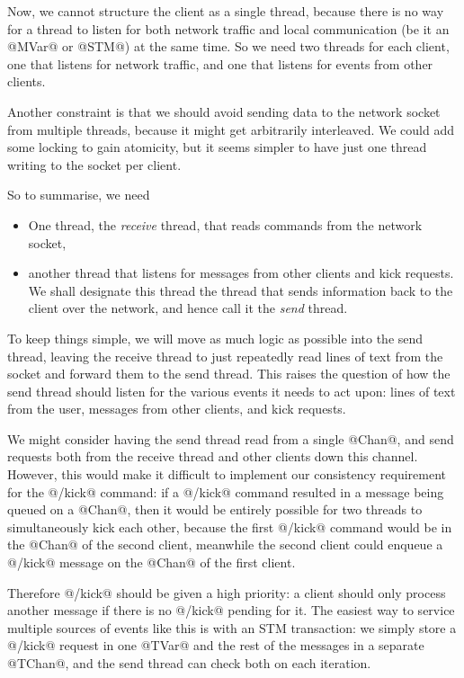Now, we cannot structure the client as a single thread, because there
is no way for a thread to listen for both network traffic and local
communication (be it an @MVar@ or @STM@) at the same time.  So we need
two threads for each client, one that listens for network traffic, and
one that listens for events from other clients.

Another constraint is that we should avoid sending data to the network
socket from multiple threads, because it might get arbitrarily
interleaved.  We could add some locking to gain atomicity, but it
seems simpler to have just one thread writing to the socket per
client.

So to summarise, we need

\begin{itemize}
\item One thread, the \emph{receive} thread, that reads commands from
  the network socket,
\item another thread that listens for messages from other clients and
  kick requests.  We shall designate this thread the thread that sends
  information back to the client over the network, and hence call it
  the \emph{send} thread.
\end{itemize}

To keep things simple, we will move as much logic as possible into the
send thread, leaving the receive thread to just repeatedly read lines
of text from the socket and forward them to the send thread.  This
raises the question of how the send thread should listen for the
various events it needs to act upon: lines of text from the user,
messages from other clients, and kick requests.

We might consider having the send thread read from a single @Chan@,
and send requests both from the receive thread and other clients down
this channel.  However, this would make it difficult to implement our
consistency requirement for the @/kick@ command: if a @/kick@ command
resulted in a message being queued on a @Chan@, then it would be
entirely possible for two threads to simultaneously kick each other,
because the first @/kick@ command would be in the @Chan@ of the second
client, meanwhile the second client could enqueue a @/kick@ message on
the @Chan@ of the first client.

Therefore @/kick@ should be given a high priority: a client should
only process another message if there is no @/kick@ pending for it.
The easiest way to service multiple sources of events like this is
with an STM transaction: we simply store a @/kick@ request in one
@TVar@ and the rest of the messages in a separate @TChan@, and the
send thread can check both on each iteration.

